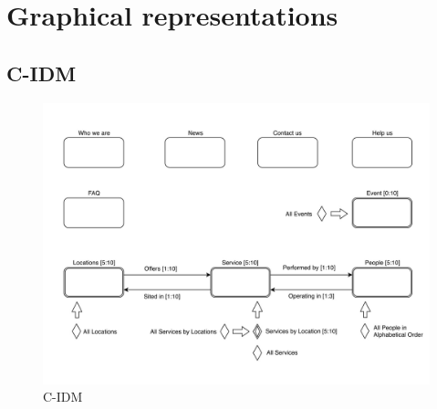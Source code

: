 %
%
\chapter{Graphical representations}
%
%
%
\section{C-IDM}
%
\begin{figure}[h]
\includegraphics[width=1.15\textwidth, center]{MainMatter/images/C-IDM.jpg}
\caption{C-IDM}
\label{fig:figure1}
\end{figure}
\FloatBarrier
%
